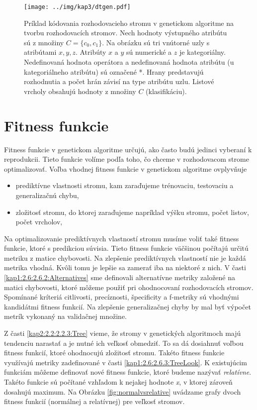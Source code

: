 \begin{figure}[h]
\centering
\centerline{\mbox{\texttt{[image: ../img/kap3/dtgen.pdf]}}}
\caption{Príklad kódovania rozhodovacieho stromu v genetickom algoritme na tvorbu rozhodovacích stromov. Nech hodnoty výstupného atribútu sú z množiny $C=\{c_0,c_1\}$. Na obrázku sú tri vnútorné uzly s atribútami $x,y,z$. Atribúty $x$ a $y$ sú numerické a $z$ je kategoriálny. Nedefinovaná hodnota operátora a nedefinovaná hodnota atribútu (u kategoriálneho atribútu) sú označené *. Hrany predstavujú rozhodnutia a počet hrán závisí na type atribútu uzlu. Listové vrcholy obsahujú hodnoty z množiny $C$ (klasifikáciu).}\label{fig:DTEncode}
\end{figure}

\section{Fitness funkcie}\label{kap3:3.3:Fitness}
Fitness funkcie v genetickom algoritme určujú, ako často budú jedinci vyberaní k reprodukcii. Tieto funkcie volíme podľa toho, čo chceme v rozhodovacom strome optimalizovať. Voľba vhodnej fitness funkcie v genetickom algoritme ovplyvňuje
\begin{itemize}
\item prediktívne vlastnosti stromu, kam zaraďujeme trénovaciu, testovaciu a generalizačnú chybu, 
\item zložitosť stromu, do ktorej zaraďujeme napríklad výšku stromu, počet listov, počet vrcholov,
\end{itemize} 

Na optimalizovanie prediktívnych vlastností stromu musíme voliť také fitness funkcie, ktoré s predikciou súvisia. Tieto fitness funkcie väčšinou počítajú určitú metriku z matice chybovosti. Na zlepšenie prediktívnych vlastností nie je každá metrika vhodná. Kvôli tomu je lepšie sa zamerať iba na niektoré z nich.
V časti \ref{kap1:2.6:2.6.2:Alternatives} sme definovali alternatívne metriky založené na matici chybovosti, ktoré môžeme použiť pri ohodnocovaní rozhodovacích stromov. Spomínané kríteriá citlivosti, precíznosti, špecificity a f-metriky sú vhodnými kandidátmi fitness funkcií. Na zlepšenie generalizačnej chyby by mal byť výpočet metrík vykonaný na validačnej množine.

Z časti \ref{kap2:2.2:2.2.3:Tree} vieme, že stromy v genetických algoritmoch majú tendenciu narastať a je nutné ich veľkosť obmedziť. To sa dá dosiahnuť voľbou fitness funkcií, ktoré ohodnocujú zložitosť stromu. Takéto fitness funkcie využívajú metriky zadefinované v časti \ref{kap1:2.6:2.6.3:TreeLook}. K existujúcim funkciám môžeme definovať nové fitness funkcie, ktoré budeme nazývať \emph{relatívne}. Takéto funkcie sú počítané vzhľadom k nejakej hodnote \emph{x}, v ktorej zároveň dosahujú maximum. Na Obrázku \ref{fig:normalvsrelative} uvádzame grafy dvoch fitness funkcií (normálnej a relatívnej) pre veľkosť stromov.

